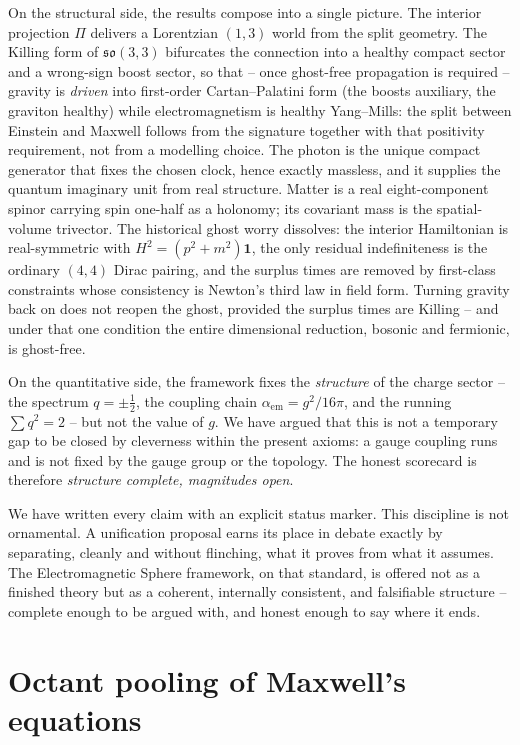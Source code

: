 \documentclass[11pt,oneside]{book}
\newcommand{\so}{\mathfrak{so}}
\theoremstyle{plain}
\theoremstyle{definition}
\theoremstyle{remark}
\begin{document}
On the structural side, the results compose into a single picture. The interior
projection $\Pi$ delivers a Lorentzian $(1,3)$ world from the split geometry. The
Killing form of $\so(3,3)$ bifurcates the connection into a healthy compact sector
and a wrong-sign boost sector, so that -- once ghost-free propagation is required --
gravity is \emph{driven} into first-order Cartan--Palatini form (the boosts
auxiliary, the graviton healthy) while electromagnetism is healthy Yang--Mills: the
split between Einstein and Maxwell follows from the signature together with that
positivity requirement, not from a modelling choice. The photon is the unique
compact generator that fixes the chosen clock, hence exactly massless, and it
supplies the quantum imaginary unit from real structure. Matter is a real
eight-component spinor carrying spin one-half as a holonomy; its covariant mass is
the spatial-volume trivector. The historical ghost worry dissolves: the interior
Hamiltonian is real-symmetric with $H^2=(p^2+m^2)\mathbf 1$, the only residual
indefiniteness is the ordinary $(4,4)$ Dirac pairing, and the surplus times are
removed by first-class constraints whose consistency is Newton's third law in field
form. Turning gravity back on does not reopen the ghost, provided the surplus times
are Killing -- and under that one condition the entire dimensional reduction,
bosonic and fermionic, is ghost-free.

On the quantitative side, the framework fixes the \emph{structure} of the charge
sector -- the spectrum $q=\pm\tfrac12$, the coupling chain
$\alpha_{\mathrm{em}}=g^2/16\pi$, and the running $\sum q^2=2$ -- but not the value
of $g$. We have argued that this is not a temporary gap to be closed by cleverness
within the present axioms: a gauge coupling runs and is not fixed by the gauge group
or the topology. The honest scorecard is therefore \emph{structure complete,
magnitudes open}.

We have written every claim with an explicit status marker. This discipline is not ornamental. A unification
proposal earns its place in debate exactly by separating, cleanly and without
flinching, what it proves from what it assumes. The Electromagnetic Sphere framework,
on that standard, is offered not as a finished theory but as a coherent, internally
consistent, and falsifiable structure -- complete enough to be argued with, and
honest enough to say where it ends.

\appendix
\chapter{Octant pooling of Maxwell's equations}
\label{app:maxwell}
\end{document}
